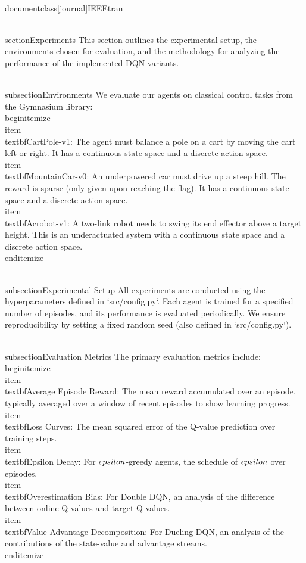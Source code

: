\\documentclass[journal]{IEEEtran}
\begin{document}
\\section{Experiments}
This section outlines the experimental setup, the environments chosen for evaluation, and the methodology for analyzing the performance of the implemented DQN variants.

\\subsection{Environments}
We evaluate our agents on classical control tasks from the Gymnasium library:
\\begin{itemize}
    \\item \\textbf{CartPole-v1}: The agent must balance a pole on a cart by moving the cart left or right. It has a continuous state space and a discrete action space.
    \\item \\textbf{MountainCar-v0}: An underpowered car must drive up a steep hill. The reward is sparse (only given upon reaching the flag). It has a continuous state space and a discrete action space.
    \\item \\textbf{Acrobot-v1}: A two-link robot needs to swing its end effector above a target height. This is an underactuated system with a continuous state space and a discrete action space.
\\end{itemize}

\\subsection{Experimental Setup}
All experiments are conducted using the hyperparameters defined in `src/config.py`. Each agent is trained for a specified number of episodes, and its performance is evaluated periodically. We ensure reproducibility by setting a fixed random seed (also defined in `src/config.py`).

\\subsection{Evaluation Metrics}
The primary evaluation metrics include:
\\begin{itemize}
    \\item \\textbf{Average Episode Reward}: The mean reward accumulated over an episode, typically averaged over a window of recent episodes to show learning progress.
    \\item \\textbf{Loss Curves}: The mean squared error of the Q-value prediction over training steps.
    \\item \\textbf{Epsilon Decay}: For $\\epsilon$-greedy agents, the schedule of $\\epsilon$ over episodes.
    \\item \\textbf{Overestimation Bias}: For Double DQN, an analysis of the difference between online Q-values and target Q-values.
    \\item \\textbf{Value-Advantage Decomposition}: For Dueling DQN, an analysis of the contributions of the state-value and advantage streams.
\\end{itemize}
\end{document}
